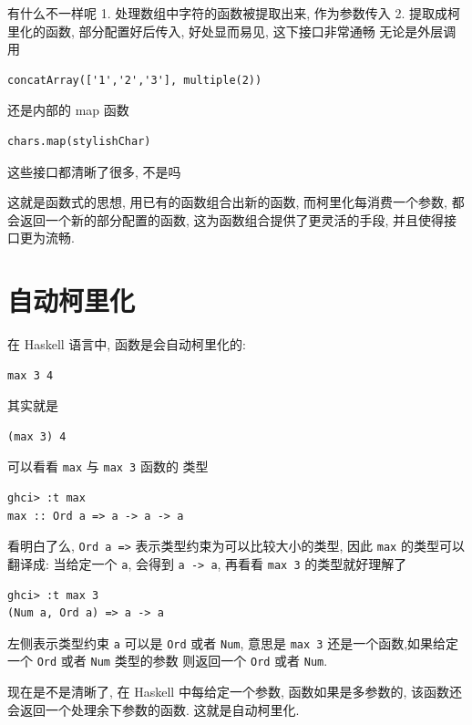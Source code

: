 \documentclass[a5paper]{book}
\begin{document}
有什么不一样呢 1. 处理数组中字符的函数被提取出来, 作为参数传入 2.
提取成柯里化的函数, 部分配置好后传入, 好处显而易见, 这下接口非常通畅
无论是外层调用

\begin{verbatim}
concatArray(['1','2','3'], multiple(2))
\end{verbatim}

还是内部的 map 函数

\begin{verbatim}
chars.map(stylishChar)
\end{verbatim}

这些接口都清晰了很多, 不是吗

这就是函数式的思想, 用已有的函数组合出新的函数, 而柯里化每消费一个参数,
都会返回一个新的部分配置的函数, 这为函数组合提供了更灵活的手段,
并且使得接口更为流畅.

\section{自动柯里化}
\label{sec:orgheadline18}

在 Haskell 语言中, 函数是会自动柯里化的:

\begin{verbatim}
max 3 4
\end{verbatim}

其实就是

\begin{verbatim}
(max 3) 4
\end{verbatim}

可以看看 \texttt{max} 与 \texttt{max 3} 函数的 类型

\begin{verbatim}
ghci> :t max
max :: Ord a => a -> a -> a
\end{verbatim}

看明白了么, \texttt{Ord a =>} 表示类型约束为可以比较大小的类型, 因此 \texttt{max}
的类型可以翻译成: 当给定一个 \texttt{a}, 会得到 \texttt{a -> a},
再看看 \texttt{max 3} 的类型就好理解了

\begin{verbatim}
ghci> :t max 3
(Num a, Ord a) => a -> a
\end{verbatim}

左侧表示类型约束 \texttt{a} 可以是 \texttt{Ord} 或者 \texttt{Num},
意思是 \texttt{max 3} 还是一个函数,如果给定一个 \texttt{Ord} 或者 \texttt{Num} 类型的参数
则返回一个 \texttt{Ord} 或者 \texttt{Num}.

现在是不是清晰了, 在 Haskell 中每给定一个参数, 函数如果是多参数的,
该函数还会返回一个处理余下参数的函数. 这就是自动柯里化.
\end{document}
